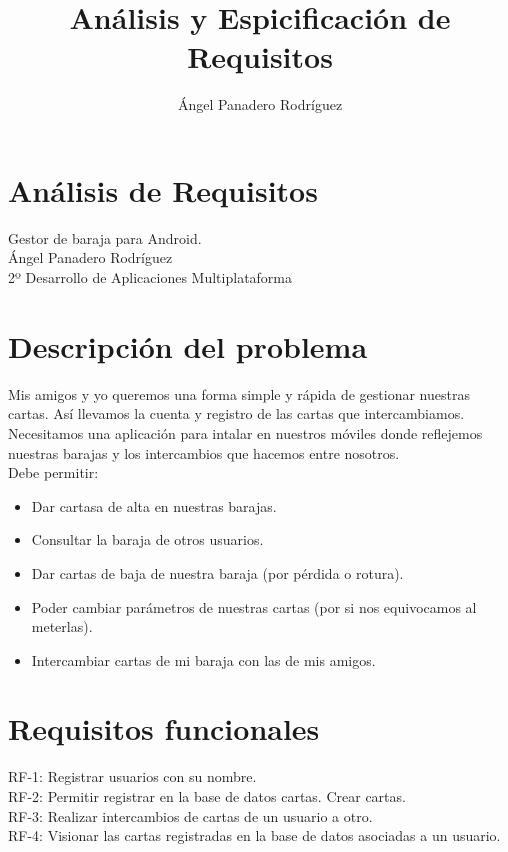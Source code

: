 \documentclass[12pt]{article}
\title{Análisis y Espicificación de Requisitos}
\author{Ángel Panadero Rodríguez}
\date{}
\begin{document}
\maketitle

\section*{Análisis de Requisitos}

Gestor de baraja para Android.\\
Ángel Panadero Rodríguez\\
2º Desarrollo de Aplicaciones Multiplataforma

\section*{Descripción del problema}

Mis amigos y yo queremos una forma simple y rápida de gestionar nuestras cartas. Así llevamos la cuenta y registro de las cartas que intercambiamos.\\
Necesitamos una aplicación para intalar en nuestros móviles donde reflejemos nuestras barajas y los intercambios que hacemos entre nosotros.\\
Debe permitir:
\begin{itemize}
\item Dar cartasa de alta en nuestras barajas.
\item Consultar la baraja de otros usuarios.
\item Dar cartas de baja de nuestra baraja (por pérdida o rotura).
\item Poder cambiar parámetros de nuestras cartas (por si nos equivocamos al meterlas).
\item Intercambiar cartas de mi baraja con las de mis amigos.
\end{itemize}

\section*{Requisitos funcionales}

RF-1: Registrar usuarios con su nombre.\\
RF-2: Permitir registrar en la base de datos cartas. Crear cartas.\\
RF-3: Realizar intercambios de cartas de un usuario a otro.\\
RF-4: Visionar las cartas registradas en la base de datos asociadas a un usuario.
\end{document}
